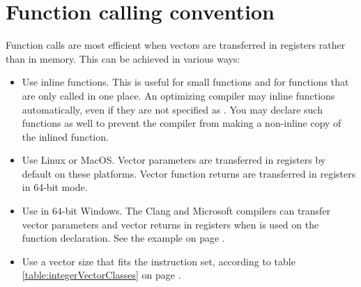 \documentclass[vcl_manual.tex]{subfiles}
\begin{document}
\section{Function calling convention}\label{FunctionCallingConvention}
Function calls are most efficient when vectors are transferred in registers rather than in memory. This can be achieved in various ways:

\begin{itemize}
\item Use inline functions. This is useful for small functions and for functions that are only called in one place. An optimizing compiler may inline functions automatically, even if they are not specified as . You may declare such functions  as well to prevent the compiler from making a non-inline copy of the inlined function.

\item Use Linux or MacOS. Vector parameters are transferred in registers by default on these platforms. Vector function returns are transferred in registers in 64-bit mode.

\item Use  in 64-bit Windows. The Clang and Microsoft compilers can transfer vector parameters and vector returns in registers when  is used on the function declaration. See the example on page \pageref{examplePolynomialVectorcall}.

\item Use a vector size that fits the instruction set, according to table \ref{table:integerVectorClasses} on page \pageref{table:integerVectorClasses}.

\end{itemize}
\end{document}
